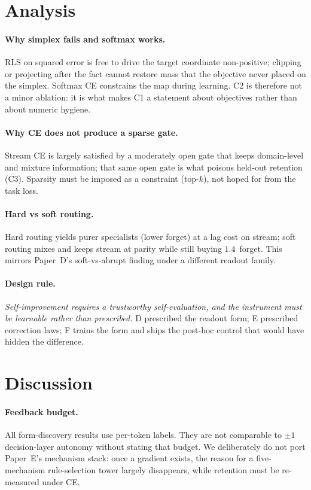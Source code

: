 \documentclass[preprint,12pt]{elsarticle}
\begin{document}
\section{Analysis}
\label{sec:analysis}

\paragraph{Why simplex fails and softmax works.}
RLS on squared error is free to drive the target coordinate
non-positive; clipping or projecting after the fact cannot restore
mass that the objective never placed on the simplex. Softmax CE
constrains the map during learning. C2 is therefore not a minor
ablation: it is what makes C1 a statement about objectives rather than
about numeric hygiene.

\paragraph{Why CE does not produce a sparse gate.}
Stream CE is largely satisfied by a moderately open gate that keeps
domain-level and mixture information; that same open gate is what
poisons held-out retention (C3). Sparsity must be imposed as a
constraint (top-$k$), not hoped for from the task loss.

\paragraph{Hard vs soft routing.}
Hard routing yields purer specialists (lower forget) at a lag cost on stream;
soft routing mixes and keeps stream at parity while still buying
$1.4$~forget. This mirrors Paper~D's soft-vs-abrupt finding under a
different readout family.

\paragraph{Design rule.}
\emph{Self-improvement requires a trustworthy self-evaluation, and the
instrument must be learnable rather than prescribed.} D prescribed the
readout form; E prescribed correction laws; F trains the form and
ships the post-hoc control that would have hidden the difference.

\section{Discussion}
\label{sec:discussion}

\paragraph{Feedback budget.}
All form-discovery results use per-token labels. They are not
comparable to $\pm1$ decision-layer autonomy without stating that
budget. We deliberately do not port Paper~E's mechanism stack: once a
gradient exists, the reason for a five-mechanism rule-selection tower
largely disappears, while retention must be re-measured under CE.
\end{document}
